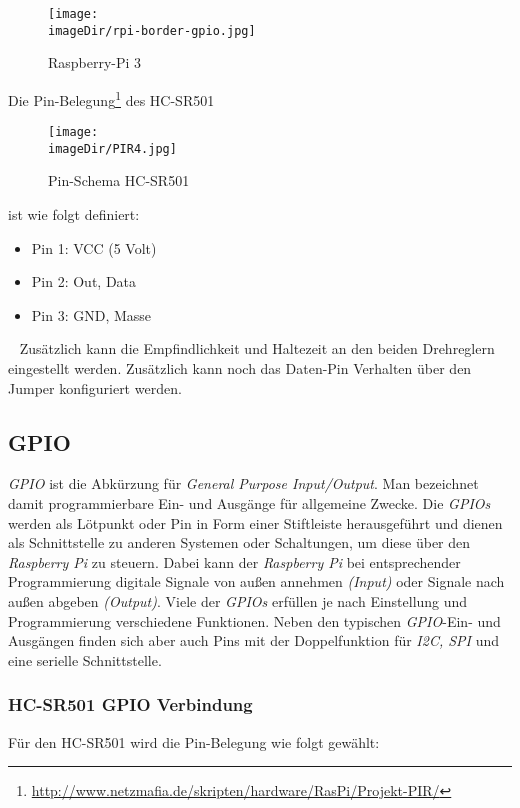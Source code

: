 \begin{figure}[h]
	\centering
	\texttt{[image: \\imageDir/rpi-border-gpio.jpg]}
	\caption{Raspberry-Pi 3}
	\label{fig:rpi-border-gpio}
\end{figure}

Die Pin-Belegung\footnote{\url{http://www.netzmafia.de/skripten/hardware/RasPi/Projekt-PIR/}} des HC-SR501

\begin{figure}[h]
	\centering
	\texttt{[image: \\imageDir/PIR4.jpg]}
	\caption{Pin-Schema HC-SR501}
	\label{fig:PIR4}
\end{figure}

ist wie folgt definiert:
\begin{itemize}
	\item Pin 1: VCC (5 Volt)
	\item Pin 2: Out, Data
	\item Pin 3: GND, Masse
\end{itemize}
\ \newpage
Zusätzlich kann die Empfindlichkeit und Haltezeit an den beiden Drehreglern eingestellt werden. Zusätzlich kann noch das Daten-Pin Verhalten über den Jumper konfiguriert werden.

\subsection{GPIO}
\emph{GPIO} ist die Abkürzung für \emph{General Purpose Input/Output}. Man bezeichnet damit programmierbare Ein- und Ausgänge für allgemeine Zwecke. Die \emph{GPIOs} werden als Lötpunkt oder Pin in Form einer Stiftleiste herausgeführt und dienen als Schnittstelle zu anderen Systemen oder Schaltungen, um diese über den \emph{Raspberry Pi} zu steuern. Dabei kann der \emph{Raspberry Pi} bei entsprechender Programmierung digitale Signale von außen annehmen \emph{(Input)} oder Signale nach außen abgeben \emph{(Output)}.
\newline
\newline
Viele der \emph{GPIOs} erfüllen je nach Einstellung und Programmierung verschiedene Funktionen. Neben den typischen \emph{GPIO}-Ein- und Ausgängen finden sich aber auch Pins mit der Doppelfunktion für \emph{I2C, SPI} und eine serielle Schnittstelle.

\subsubsection{HC-SR501 GPIO Verbindung}
Für den HC-SR501 wird die Pin-Belegung wie folgt gewählt:

